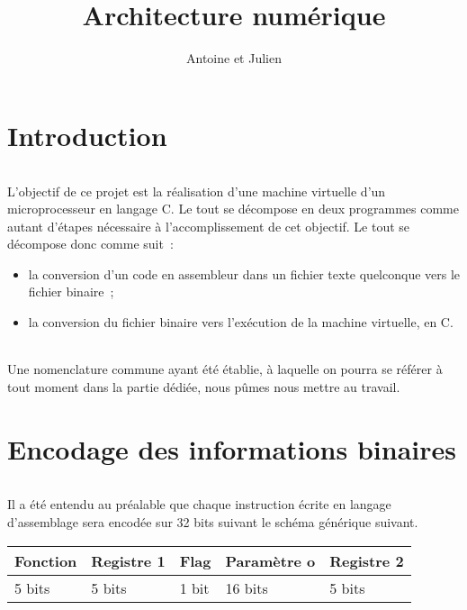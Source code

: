 \documentclass[11pt]{article}
\begin{document}
	\title{Architecture numérique}
	\author{Antoine  et Julien }
	\maketitle

	\part*{Introduction}
	\paragraph{}
	L'objectif de ce projet est la réalisation d'une machine virtuelle d'un microprocesseur en langage C. Le tout se décompose en deux programmes comme autant d'étapes nécessaire à l'accomplissement de cet objectif. Le tout se décompose donc comme suit~:

	\begin{itemize}
		\item la conversion d'un code en assembleur dans un fichier texte quelconque vers le fichier binaire~;
		\item la conversion du fichier binaire vers l'exécution de la machine virtuelle, en C.
	\end{itemize}

	\paragraph{}
	Une nomenclature commune ayant été établie, à laquelle on pourra se référer à tout moment dans la partie dédiée, nous pûmes nous mettre au travail.

	\part*{Encodage des informations binaires}
	\paragraph{}
	Il a été entendu au préalable que chaque instruction écrite en langage d'assemblage sera encodée sur 32 bits suivant le schéma générique suivant.

	\begin{table}[h]
		\centering
		\begin{tabular}{|l|l|l|l|l|l|l|l|l|l|l|l|l|l|l|l|l|l|l|l|l|l|l|l|l|l|l|l|l|l|l|l|}
			\hline
			\multicolumn{5}{|l|}{\textbf{Fonction}} & \multicolumn{5}{l|}{\textbf{Registre 1}} & \textbf{Flag} & \multicolumn{16}{l|}{\textbf{Paramètre o}} & \multicolumn{5}{l|}{\textbf{Registre 2}} \\ \hline
			\multicolumn{5}{|l|}{5 bits} & \multicolumn{5}{l|}{5 bits} & 1 bit & \multicolumn{16}{l|}{16 bits} & \multicolumn{5}{l|}{5 bits} \\ \hline
		\end{tabular}
	\end{table}
\end{document}
